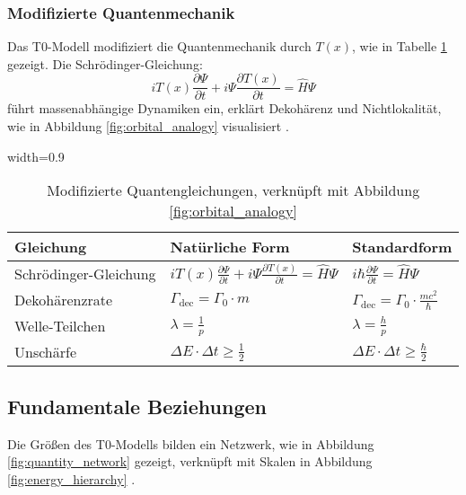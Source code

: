 \documentclass[12pt,a4paper]{article}
\newcommand{\Tfield}{T(x)}
\newcommand{\tablescale}{0.9}
\begin{document}
	\subsubsection{Modifizierte Quantenmechanik}
	\label{subsec:quantum}
	
	Das T0-Modell modifiziert die Quantenmechanik durch \(\Tfield\), wie in Tabelle \ref{tab:qm_equations} gezeigt. Die Schrödinger-Gleichung:
	\[
	i \Tfield \frac{\partial \Psi}{\partial t} + i \Psi \frac{\partial \Tfield}{\partial t} = \hat{H} \Psi
	\]
	führt massenabhängige Dynamiken ein, erklärt Dekohärenz und Nichtlokalität, wie in Abbildung \ref{fig:orbital_analogy} visualisiert \cite{pascher_quantum_2025}.
	
	\begin{table}[htbp]
		\centering
		\begin{adjustbox}{width=\tablescale\textwidth}
			\begin{tabular}{lll}
				\toprule
				\textbf{Gleichung} & \textbf{Natürliche Form} & \textbf{Standardform} \\
				\midrule
				Schrödinger-Gleichung & \(i \Tfield \frac{\partial \Psi}{\partial t} + i \Psi \frac{\partial \Tfield}{\partial t} = \hat{H} \Psi\) & \(i \hbar \frac{\partial \Psi}{\partial t} = \hat{H} \Psi\) \\
				Dekohärenzrate & \(\Gamma_{\text{dec}} = \Gamma_0 \cdot m\) & \(\Gamma_{\text{dec}} = \Gamma_0 \cdot \frac{m c^2}{\hbar}\) \\
				Welle-Teilchen & \(\lambda = \frac{1}{p}\) & \(\lambda = \frac{h}{p}\) \\
				Unschärfe & \(\Delta E \cdot \Delta t \geq \frac{1}{2}\) & \(\Delta E \cdot \Delta t \geq \frac{\hbar}{2}\) \\
				\bottomrule
			\end{tabular}
		\end{adjustbox}
		\caption{Modifizierte Quantengleichungen, verknüpft mit Abbildung \ref{fig:orbital_analogy}}
		\label{tab:qm_equations}
	\end{table}
	
	\subsection{Fundamentale Beziehungen}
	\label{subsec:relationships}
	
	Die Größen des T0-Modells bilden ein Netzwerk, wie in Abbildung \ref{fig:quantity_network} gezeigt, verknüpft mit Skalen in Abbildung \ref{fig:energy_hierarchy} \cite{pascher_grundkraefte_2025}.
	
\end{document}
